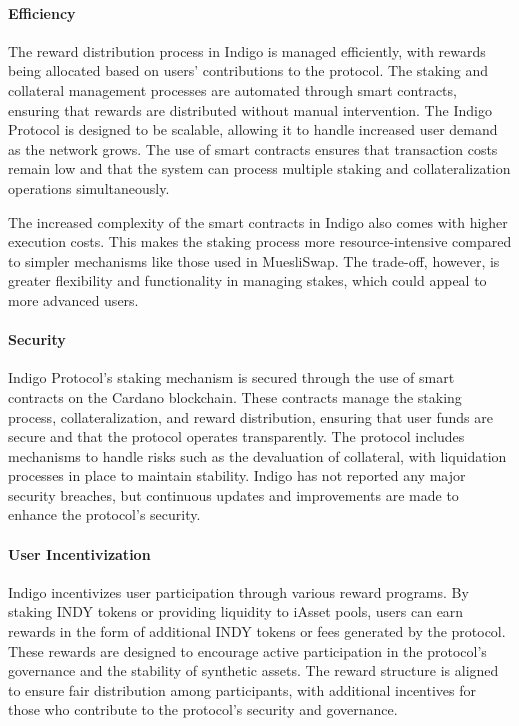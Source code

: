 \documentclass[12pt,parskip=full, tikz]{article}
\begin{document}
\paragraph{Efficiency}

The reward distribution process in Indigo is managed efficiently, with rewards being allocated based on users' contributions to the protocol. The staking and collateral management processes are automated through smart contracts, ensuring that rewards are distributed without manual intervention. The Indigo Protocol is designed to be scalable, allowing it to handle increased user demand as the network grows. The use of smart contracts ensures that transaction costs remain low and that the system can process multiple staking and collateralization operations simultaneously.

The increased complexity of the smart contracts in Indigo also comes with higher execution costs. This makes the staking process more resource-intensive compared to simpler mechanisms like those used in MuesliSwap. The trade-off, however, is greater flexibility and functionality in managing stakes, which could appeal to more advanced users.

\paragraph{Security}

Indigo Protocol's staking mechanism is secured through the use of smart contracts on the Cardano blockchain. These contracts manage the staking process, collateralization, and reward distribution, ensuring that user funds are secure and that the protocol operates transparently. The protocol includes mechanisms to handle risks such as the devaluation of collateral, with liquidation processes in place to maintain stability. Indigo has not reported any major security breaches, but continuous updates and improvements are made to enhance the protocol's security.

\paragraph{User Incentivization}

Indigo incentivizes user participation through various reward programs. By staking INDY tokens or providing liquidity to iAsset pools, users can earn rewards in the form of additional INDY tokens or fees generated by the protocol. These rewards are designed to encourage active participation in the protocol's governance and the stability of synthetic assets. The reward structure is aligned to ensure fair distribution among participants, with additional incentives for those who contribute to the protocol's security and governance.
\end{document}

